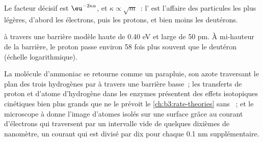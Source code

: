 Le facteur décisif est $\eu^{-2\kappa a}$, et $\kappa \propto \sqrt m$~:
l' est l'affaire des particules les plus légères, d'abord les
électrons, puis les protons, et bien moins les deutérons.

\begin{omfigure}

{\small {} à travers une barrière modèle haute
de 0.40 eV et large de 50 pm. À mi-hauteur de la barrière, le proton
passe environ 58 fois plus souvent que le deutéron (échelle
logarithmique).}
\end{omfigure}

\begin{remark}\label{rem:b3:quantum-model-systems:where}
La molécule d'ammoniac se retourne comme un parapluie, son azote
traversant le plan des trois hydrogènes par  à travers une
barrière basse~; les transferts de proton et d'atome d'hydrogène dans les
enzymes présentent des effets isotopiques cinétiques bien plus grands que
ne le prévoit le \cref{ch:b3:rate-theories} sans ~; et le
microscope à  donne l'image d'atomes isolés sur une surface
grâce au courant d'électrons qui traversent par  un intervalle
vide de quelques dixièmes de nanomètre, un courant qui est divisé par dix
pour chaque 0.1 nm supplémentaire.
\end{remark}

